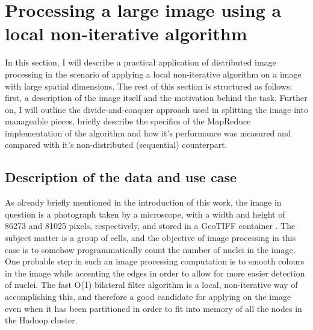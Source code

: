 \documentclass [12pt,a4paper]{report}
\begin{document}
\clearpage
\section{Processing a large image using a local non-iterative algorithm}

In this section, I will describe a practical application of distributed image processing in the scenario of applying a local non-iterative algorithm on a image with large spatial dimensions. The rest of this section is structured as follows: first, a description of the image itself and the motivation behind the task. Further on, I will outline the divide-and-conquer approach used in splitting the image into manageable pieces, briefly describe the specifics of the MapReduce implementation of the algorithm and how it's performance was measured and compared with it's non-distributed (sequential) counterpart.

\subsection{Description of the data and use case}

As already briefly mentioned in the introduction of this work, the image in question is a photograph taken by a microscope, with a width and height of 86273 and 81025 pixels, respectively, and stored in a GeoTIFF container \cite{mahammad2003geotiff}. The subject matter is a group of cells, and the objective of image processing in this case is to somehow programmatically count the number of nuclei in the image. One probable step in such an image processing computation is to smooth colours in the image while accenting the edges in order to allow for more easier detection of nuclei. The fast O(1) bilateral filter algorithm is a local, non-iterative way of accomplishing this, and therefore a good candidate for applying on the image even when it has been partitioned in order to fit into memory of all the nodes in the Hadoop cluster.
\end{document}
